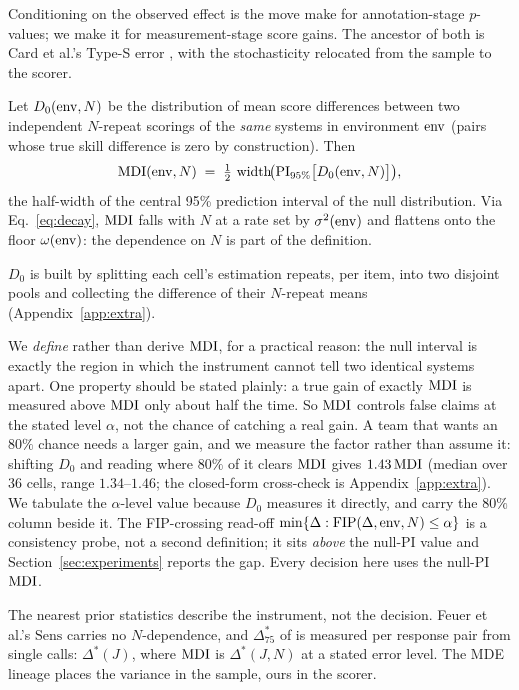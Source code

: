 Conditioning on the observed effect is the move \citet{baumann2025llmhacking}
make for annotation-stage $p$-values; we make it for measurement-stage
score gains. The ancestor of both is Card et al.'s Type-S error
\citep{card2020power}, with the stochasticity relocated from the sample to
the scorer.

\begin{definition}
  \label{def:mdi}
  Let $D_0(\mathrm{env}, N)$ be the distribution of mean score differences between
  two independent $N$-repeat scorings of the \emph{same} systems in
  environment $\mathrm{env}$ (pairs whose true skill difference is zero by
  construction). Then
  \begin{equation*}
    \mathrm{MDI}(\mathrm{env}, N)
      \;=\; \tfrac{1}{2}\,
      \operatorname{width}\!\bigl(\mathrm{PI}_{95\%}\bigl[D_0(\mathrm{env}, N)\bigr]\bigr),
  \end{equation*}
  the half-width of the central 95\% prediction interval of the null
  distribution. Via Eq.~\eqref{eq:decay}, $\mathrm{MDI}$ falls with $N$ at a rate
  set by $\sigma^2(\mathrm{env})$ and flattens onto the floor $\omega(\mathrm{env})$: the
  dependence on $N$ is part of the definition.
\end{definition}

$D_0$ is built by splitting each cell's estimation repeats, per item, into two
disjoint pools and collecting the difference of their $N$-repeat means
(Appendix~\ref{app:extra}).

We \emph{define} rather than derive $\mathrm{MDI}$, for a practical reason: the null
interval is exactly the region in which the instrument cannot tell two
identical systems apart. One property should be stated plainly: a true gain
of exactly $\mathrm{MDI}$ is measured above $\mathrm{MDI}$ only about half the time. So $\mathrm{MDI}$
controls false claims at the stated level $\alpha$, not the chance of catching a real gain.
A team that wants an $80\%$ chance needs a larger gain, and we measure the
factor rather than assume it: shifting $D_0$ and reading where $80\%$ of it
clears $\mathrm{MDI}$ gives $1.43\,\mathrm{MDI}$ (median over 36 cells, range
$1.34$--$1.46$; the closed-form cross-check is
Appendix~\ref{app:extra}). We tabulate the $\alpha$-level value
because $D_0$ measures it directly, and carry the $80\%$ column beside it.
The FIP-crossing read-off
$\min\{\Delta : \mathrm{FIP}(\Delta, \mathrm{env}, N) \le \alpha\}$ is a consistency probe,
not a second definition; it sits \emph{above} the null-PI value and
Section~\ref{sec:experiments} reports the gap. Every decision here uses the
null-PI $\mathrm{MDI}$.

The nearest prior statistics describe the instrument, not the decision. Feuer
et al.'s $\mathrm{Sens}$ \citep{feuer2025judgmentnoise} carries no
$N$-dependence, and $\Delta^*_{75}$ of \citet{usami2026darkcurrent} is measured
per response pair from single calls: $\Delta^*(J)$, where $\mathrm{MDI}$ is $\Delta^*(J, N)$ at
a stated error level. The MDE lineage \citep{card2020power,
miller2024errorbars, kotawala2026resolution} places the variance in the sample,
ours in the scorer.

